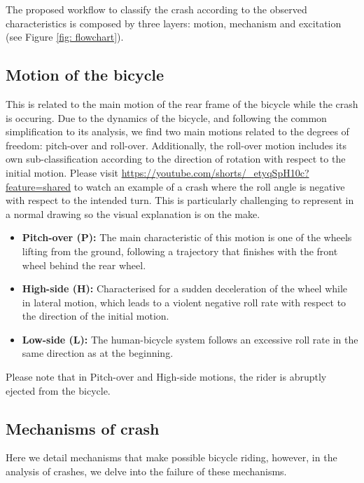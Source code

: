 \documentclass{article}
\begin{document}
The proposed workflow to classify the crash according to the observed characteristics is composed by three layers: motion, mechanism and excitation (see Figure \ref{fig: flowchart}).

\subsection{Motion of the bicycle}

This is related to the main motion of the rear frame of the bicycle while the crash is occuring.
%
Due to the dynamics of the bicycle, and following the common simplification to its analysis, we find two main motions related to the degrees of freedom: pitch-over and roll-over.
%
Additionally, the roll-over motion includes its own sub-classification according to the direction of rotation with respect to the initial motion.
% 
Please visit \url{https://youtube.com/shorts/_etyqSpH10c?feature=shared} to watch an example of a crash where the roll angle is negative with respect to the intended turn.
%
This is particularly challenging to represent in a normal drawing so the visual explanation is on the make.

\begin{itemize}
    \item \textbf{Pitch-over (P):} The main characteristic of this motion is one of the wheels lifting from the ground, following a trajectory that finishes with the front wheel behind the rear wheel.
    \item \textbf{High-side (H):} Characterised for a sudden deceleration of the wheel while in lateral motion, which leads to a violent negative roll rate with respect to the direction of the initial motion.
    \item \textbf{Low-side (L):} The human-bicycle system follows an excessive roll rate in the same direction as at the beginning.
\end{itemize}

Please note that in Pitch-over and High-side motions, the rider is abruptly ejected from the bicycle.


\subsection{Mechanisms of crash}

Here we detail mechanisms that make possible bicycle riding, however, in the analysis of crashes, we delve into the failure of these mechanisms.
\end{document}
